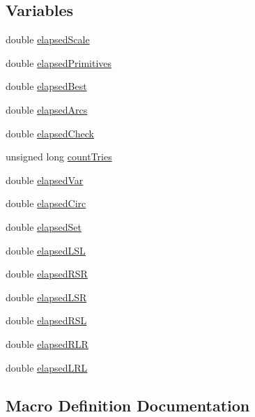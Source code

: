 \subsection*{Variables}
\begin{DoxyCompactItemize}
\item 
double \mbox{\hyperlink{dubins_8hh_a5880c4830bf2ab16bad216015448eacb}{elapsed\+Scale}}
\item 
double \mbox{\hyperlink{dubins_8hh_aa36733aa8c8ca5849070a465409dbe81}{elapsed\+Primitives}}
\item 
double \mbox{\hyperlink{dubins_8hh_a0031b22718178ccc76a4d8178e582b25}{elapsed\+Best}}
\item 
double \mbox{\hyperlink{dubins_8hh_a2ea7ce6fc7223d1e06dc71644336d66f}{elapsed\+Arcs}}
\item 
double \mbox{\hyperlink{dubins_8hh_a06fc38271c4ca7f7799fa903d94cae5a}{elapsed\+Check}}
\item 
unsigned long \mbox{\hyperlink{dubins_8hh_abcfdf634840cd6f14ae6d0762ecd1f95}{count\+Tries}}
\item 
double \mbox{\hyperlink{dubins_8hh_addc0762dc6f907d08093d87133317157}{elapsed\+Var}}
\item 
double \mbox{\hyperlink{dubins_8hh_ad0abfff7e943d5425fde32277365912b}{elapsed\+Circ}}
\item 
double \mbox{\hyperlink{dubins_8hh_abb6d93608c94bd3bd63217dc721ea2bf}{elapsed\+Set}}
\item 
double \mbox{\hyperlink{dubins_8hh_af7f52b98e604497e1df6126251edffcf}{elapsed\+L\+SL}}
\item 
double \mbox{\hyperlink{dubins_8hh_a5381897b84c903a717eda9680319f40a}{elapsed\+R\+SR}}
\item 
double \mbox{\hyperlink{dubins_8hh_ada1c98b34a456476f08c5cafbfe893ad}{elapsed\+L\+SR}}
\item 
double \mbox{\hyperlink{dubins_8hh_acb44475744bcbfbdf6609efd02c6c6fb}{elapsed\+R\+SL}}
\item 
double \mbox{\hyperlink{dubins_8hh_a3972b672793842e7de439255254d3085}{elapsed\+R\+LR}}
\item 
double \mbox{\hyperlink{dubins_8hh_a715f7de2f92786df84a14e5a013b94e9}{elapsed\+L\+RL}}
\end{DoxyCompactItemize}


\subsection{Macro Definition Documentation}
\mbox{\label{dubins_8hh_a940b85a83458e94519f2685b33ddd276}} 
